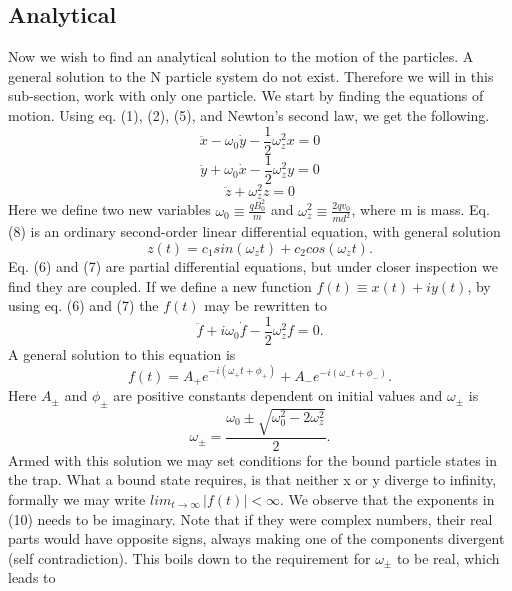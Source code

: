 \documentclass[english,notitlepage,reprint,nofootinbib]{revtex4-1}
\begin{document}
\subsection*{Analytical}
Now we wish to find an analytical solution to the motion of the particles. A general solution to the N particle system do not exist. Therefore we will in this sub-section, work with only one particle. We start by finding the equations of motion. Using eq. (1), (2), (5), and Newton's second law, we get the following.
\begin{equation}
\ddot{x} - \omega _0 \dot{y} - \frac{1}{2} \omega _z ^2 x = 0
\end{equation}
\begin{equation}
\ddot{y} + \omega _0 \dot{x} - \frac{1}{2} \omega _z ^2 y = 0
\end{equation}
\begin{equation}
\ddot{z} + \omega _z ^2 z = 0
\end{equation}
Here we define two new variables $ \omega_0 \equiv \frac{q B_0 ^2}{m}$ and $ \omega _z ^2 \equiv \frac{2qv_0}{md^2} $, where m is mass. Eq. (8) is an ordinary second-order linear differential equation, with general solution
\begin{equation}
    z(t) = c_1 sin( \omega_z t) + c_2 cos( \omega_z t).
\end{equation}
Eq. (6) and (7) are partial differential equations, but under closer inspection we find they are coupled. If we define a new function $f(t) \equiv x(t) + iy(t)$, by using eq. (6) and (7) the $f(t)$ may be rewritten to
$$ \ddot{f} + i \omega_0 \dot{f} - \frac{1}{2} \omega_z ^2 f = 0 .$$
A general solution to this equation is
\begin{equation}
f(t) = A_+ e^{-i(\omega_+ t + \phi_+)} + A_- e^{-i(\omega_- t + \phi_-)}.
\end{equation}
Here $A_{\pm}$ and $\phi _{\pm}$ are positive constants dependent on initial values and $\omega _{\pm}$ is
$$ \omega_{\pm} = \frac{\omega_0 \pm \sqrt{ \omega_0 ^2 - 2 \omega _z^2}}{2}. $$
Armed with this solution we may set conditions for the bound particle states in the trap. What a bound state requires, is that neither x or y diverge to infinity, formally we may write $lim _{t \rightarrow \infty} \,|f(t)| < \infty $. We observe that the exponents in (10) needs to be imaginary. Note that if they were complex numbers, their real parts would have opposite signs, always making one of the components divergent (self contradiction). This boils down to the requirement for $\omega_{\pm}$ to be real, which leads to
\end{document}
